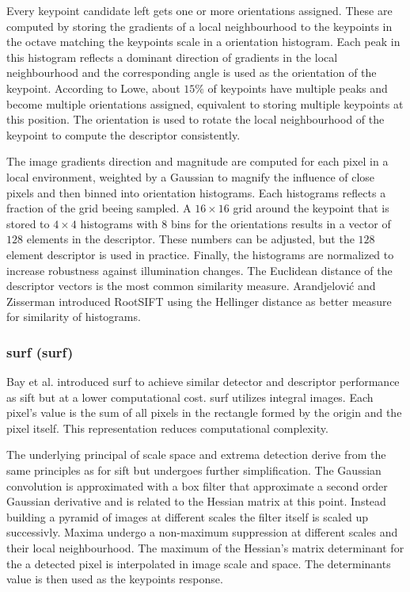 Every keypoint candidate left gets one or more orientations assigned.
These are computed by storing the gradients of a local neighbourhood to the keypoints in the octave matching the keypoints scale in a orientation histogram.
Each peak in this histogram reflects a dominant direction of gradients in the local neighbourhood and the corresponding angle is used as the orientation of the keypoint.
According to Lowe, about $15\%$ of keypoints have multiple peaks and become multiple orientations assigned, equivalent to storing multiple keypoints at this position.
The orientation is used to rotate the local neighbourhood of the keypoint to compute the descriptor consistently.

The image gradients direction and magnitude are computed for each pixel in a local environment, weighted by a Gaussian to magnify the influence of close pixels and then binned into orientation histograms.
Each histograms reflects a fraction of the grid beeing sampled.
A $16 \times 16$ grid around the keypoint that is stored to $4 \times 4$ histograms with $8$ bins for the orientations results in a vector of $128$ elements in the descriptor.
These numbers can be adjusted, but the $128$ element descriptor is used in practice.
Finally, the histograms are normalized to increase robustness against illumination changes.
The Euclidean distance of the descriptor vectors is the most common similarity measure.
Arandjelović and Zisserman\cite{arandjelovic_2012} introduced RootSIFT using the Hellinger distance\cite{hellinger_1909} as better measure for similarity of histograms.

\subsubsection{\acrshort{surf} (\acrlong{surf})}

Bay et al. introduced \acrshort{surf}\cite{bay_eccv06} to achieve similar detector and descriptor performance as \acrshort{sift} but at a lower computational cost.
\acrshort{surf} utilizes integral images\cite{viola_cvpr01}.
Each pixel's value is the sum of all pixels in the rectangle formed by the origin and the pixel itself.
This representation reduces computational complexity.

The underlying principal of scale space and extrema detection derive from the same principles as for \acrshort{sift} but undergoes further simplification.
The Gaussian convolution is approximated with a box filter that approximate a second order Gaussian derivative and is related to the Hessian matrix at this point.
Instead building a pyramid of images at different scales the filter itself is scaled up successivly.
Maxima undergo a non-maximum suppression at different scales and their local neighbourhood.
The maximum of the Hessian's matrix determinant for the a detected pixel is interpolated in image scale and space.
The determinants value is then used as the keypoints response.

